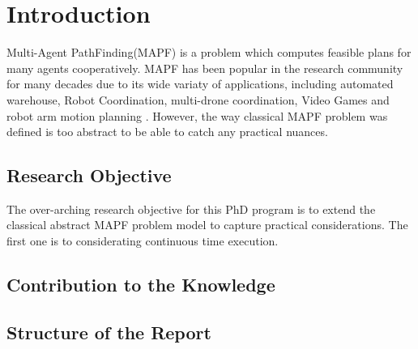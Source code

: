 \chapter{Introduction}
Multi-Agent PathFinding(MAPF) is a problem which computes feasible plans for many agents cooperatively.
MAPF has been popular in the research community for many decades due to its wide variaty of applications, including automated warehouse\cite{warehouse1_2008,warehouse2_2020,warehouse3_2017}, Robot Coordination\cite{robot_2016}, multi-drone coordination\cite{drone_2022}, Video Games\cite{vidGame_2022} and robot arm motion planning \cite{motion_planning_2021}.
However, the way classical MAPF problem was defined is too abstract to be able to catch any practical nuances.  

\section{Research Objective}
The over-arching research objective for this PhD program is to extend the classical abstract MAPF problem model to capture practical considerations. 
The first one is to considerating continuous time execution. 
\section{Contribution to the Knowledge}
\section{Structure of the Report}
